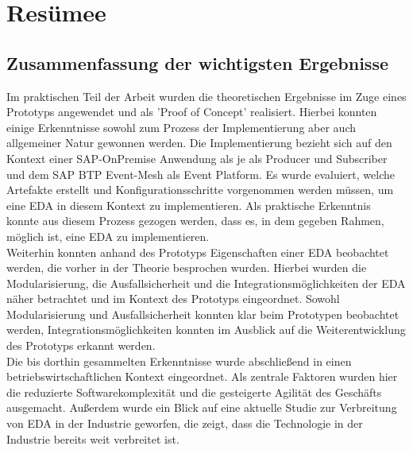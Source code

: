 \section{Resümee}
\subsection{Zusammenfassung der wichtigsten Ergebnisse}
Im praktischen Teil der Arbeit wurden die theoretischen Ergebnisse im Zuge eines Prototyps angewendet und als 'Proof of Concept' realisiert. Hierbei konnten einige Erkenntnisse sowohl zum Prozess der Implementierung aber auch allgemeiner Natur gewonnen werden. Die Implementierung bezieht sich auf den Kontext einer SAP-OnPremise Anwendung als je als Producer und Subscriber und dem SAP BTP Event-Mesh als Event Platform. Es wurde evaluiert, welche Artefakte erstellt und Konfigurationsschritte vorgenommen werden müssen, um eine \ac{EDA} in diesem Kontext zu implementieren. Als praktische Erkenntnis konnte aus diesem Prozess gezogen werden, dass es, in dem gegeben Rahmen, möglich ist, eine \ac{EDA} zu implementieren. \\
Weiterhin konnten anhand des Prototyps Eigenschaften einer \ac{EDA} beobachtet werden, die vorher in der Theorie besprochen wurden. Hierbei wurden die Modularisierung, die Ausfallsicherheit und die Integrationsmöglichkeiten der \ac{EDA} näher betrachtet und im Kontext des Prototyps eingeordnet. Sowohl Modularisierung und Ausfallsicherheit konnten klar beim Prototypen beobachtet werden, Integrationsmöglichkeiten konnten im Ausblick auf die Weiterentwicklung des Prototyps erkannt werden. \\
Die bis dorthin gesammelten Erkenntnisse wurde abschließend in einen betriebswirtschaftlichen Kontext eingeordnet. Als zentrale Faktoren wurden hier die reduzierte Softwarekomplexität und die gesteigerte Agilität des Geschäfts ausgemacht. Außerdem wurde ein Blick auf eine aktuelle Studie zur Verbreitung von \ac{EDA} in der Industrie geworfen, die zeigt, dass die Technologie in der Industrie bereits weit verbreitet ist.

